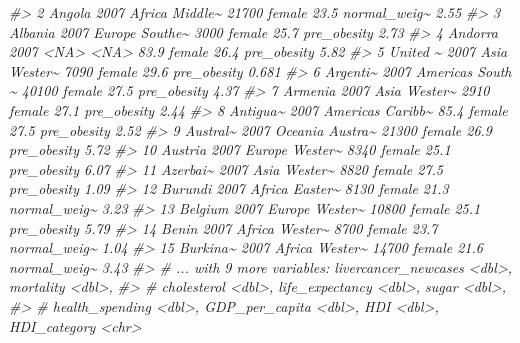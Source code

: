 \documentclass[
]{book}
\newenvironment{Shaded}{\begin{snugshade}}{\end{snugshade}}
\newcommand{\CommentTok}[1]{\textcolor[rgb]{0.56,0.35,0.01}{\textit{#1}}}
\begin{document}
\begin{Shaded}
\begin{Highlighting}[]
\CommentTok{\#\textgreater{}  2 Angola    2007 Africa    Middle\textasciitilde{}    21700   female  23.5 normal\_weig\textasciitilde{}  2.55  }
\CommentTok{\#\textgreater{}  3 Albania   2007 Europe    Southe\textasciitilde{}     3000   female  25.7 pre\_obesity   2.73  }
\CommentTok{\#\textgreater{}  4 Andorra   2007 \textless{}NA\textgreater{}      \textless{}NA\textgreater{}          83.9 female  26.4 pre\_obesity   5.82  }
\CommentTok{\#\textgreater{}  5 United \textasciitilde{}  2007 Asia      Wester\textasciitilde{}     7090   female  29.6 pre\_obesity   0.681 }
\CommentTok{\#\textgreater{}  6 Argenti\textasciitilde{}  2007 Americas  South \textasciitilde{}    40100   female  27.5 pre\_obesity   4.37  }
\CommentTok{\#\textgreater{}  7 Armenia   2007 Asia      Wester\textasciitilde{}     2910   female  27.1 pre\_obesity   2.44  }
\CommentTok{\#\textgreater{}  8 Antigua\textasciitilde{}  2007 Americas  Caribb\textasciitilde{}       85.4 female  27.5 pre\_obesity   2.52  }
\CommentTok{\#\textgreater{}  9 Austral\textasciitilde{}  2007 Oceania   Austra\textasciitilde{}    21300   female  26.9 pre\_obesity   5.72  }
\CommentTok{\#\textgreater{} 10 Austria   2007 Europe    Wester\textasciitilde{}     8340   female  25.1 pre\_obesity   6.07  }
\CommentTok{\#\textgreater{} 11 Azerbai\textasciitilde{}  2007 Asia      Wester\textasciitilde{}     8820   female  27.5 pre\_obesity   1.09  }
\CommentTok{\#\textgreater{} 12 Burundi   2007 Africa    Easter\textasciitilde{}     8130   female  21.3 normal\_weig\textasciitilde{}  3.23  }
\CommentTok{\#\textgreater{} 13 Belgium   2007 Europe    Wester\textasciitilde{}    10800   female  25.1 pre\_obesity   5.79  }
\CommentTok{\#\textgreater{} 14 Benin     2007 Africa    Wester\textasciitilde{}     8700   female  23.7 normal\_weig\textasciitilde{}  1.04  }
\CommentTok{\#\textgreater{} 15 Burkina\textasciitilde{}  2007 Africa    Wester\textasciitilde{}    14700   female  21.6 normal\_weig\textasciitilde{}  3.43  }
\CommentTok{\#\textgreater{} \# ... with 9 more variables: livercancer\_newcases \textless{}dbl\textgreater{}, mortality \textless{}dbl\textgreater{},}
\CommentTok{\#\textgreater{} \#   cholesterol \textless{}dbl\textgreater{}, life\_expectancy \textless{}dbl\textgreater{}, sugar \textless{}dbl\textgreater{},}
\CommentTok{\#\textgreater{} \#   health\_spending \textless{}dbl\textgreater{}, GDP\_per\_capita \textless{}dbl\textgreater{}, HDI \textless{}dbl\textgreater{}, HDI\_category \textless{}chr\textgreater{}}
\end{Highlighting}
\end{Shaded}
\end{document}
